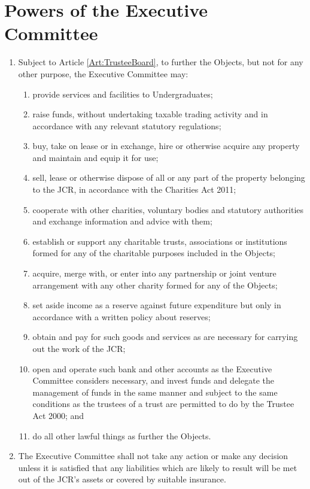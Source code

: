 \documentclass[11pt,a4paper, oneside]{memoir}
\begin{document}
	\section{Powers of the Executive Committee}
	\label{Art:TrusteePowers}
	\begin{enumerate}
		\item Subject to Article \ref{Art:TrusteeBoard}, to further the Objects, but not for any other purpose, the Executive Committee may:
		\begin{enumerate}
			\item provide services and facilities to Undergraduates;
			\item raise funds, without undertaking taxable trading activity and in accordance with any relevant statutory regulations;
			\item buy, take on lease or in exchange, hire or otherwise acquire any property and maintain and equip it for use;
			\item sell, lease or otherwise dispose of all or any part of the property belonging to the JCR, in accordance with the Charities Act 2011;
			\item cooperate with other charities, voluntary bodies and statutory authorities and exchange information and advice with them;
			\item establish or support any charitable trusts, associations or institutions formed for any of the charitable purposes included in the Objects;
			\item acquire, merge with, or enter into any partnership or joint venture arrangement with any other charity formed for any of the Objects;
			\item set aside income as a reserve against future expenditure but only in accordance with a written policy about reserves;
			\item obtain and pay for such goods and services as are necessary for carrying out the work of the JCR;
			\item open and operate such bank and other accounts as the Executive Committee considers necessary, and invest funds and delegate the management of funds in the same manner and subject to the same conditions as the trustees of a trust are permitted to do by the Trustee Act 2000; and
			\item do all other lawful things as further the Objects.
		\end{enumerate}
		\item The Executive Committee shall not take any action or make any decision unless it is satisfied that any liabilities which are likely to result will be met out of the JCR's assets or covered by suitable insurance.
	\end{enumerate}
\end{document}
